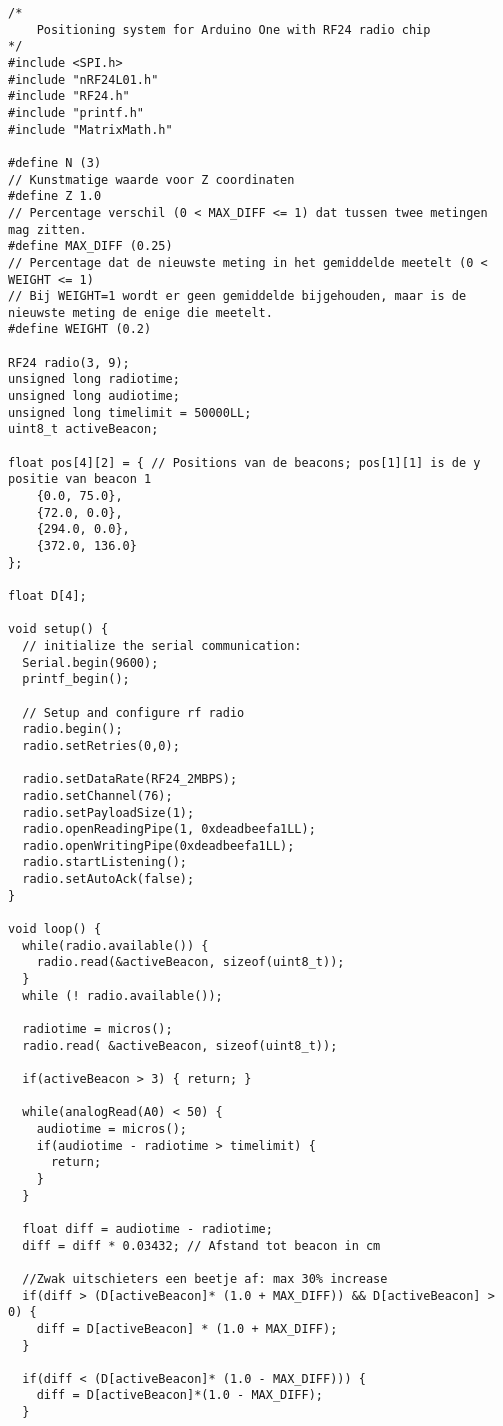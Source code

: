 \begin{lstlisting}
/*
    Positioning system for Arduino One with RF24 radio chip
*/
#include <SPI.h>
#include "nRF24L01.h"
#include "RF24.h"
#include "printf.h"
#include "MatrixMath.h"

#define N (3)
// Kunstmatige waarde voor Z coordinaten
#define Z 1.0
// Percentage verschil (0 < MAX_DIFF <= 1) dat tussen twee metingen mag zitten.
#define MAX_DIFF (0.25)
// Percentage dat de nieuwste meting in het gemiddelde meetelt (0 < WEIGHT <= 1)
// Bij WEIGHT=1 wordt er geen gemiddelde bijgehouden, maar is de nieuwste meting de enige die meetelt.
#define WEIGHT (0.2)

RF24 radio(3, 9);
unsigned long radiotime;
unsigned long audiotime;
unsigned long timelimit = 50000LL;
uint8_t activeBeacon;

float pos[4][2] = { // Positions van de beacons; pos[1][1] is de y positie van beacon 1
    {0.0, 75.0},
    {72.0, 0.0},
    {294.0, 0.0},
    {372.0, 136.0}
};

float D[4];

void setup() {
  // initialize the serial communication:
  Serial.begin(9600);
  printf_begin();

  // Setup and configure rf radio
  radio.begin();
  radio.setRetries(0,0);

  radio.setDataRate(RF24_2MBPS);
  radio.setChannel(76);
  radio.setPayloadSize(1);
  radio.openReadingPipe(1, 0xdeadbeefa1LL);
  radio.openWritingPipe(0xdeadbeefa1LL);
  radio.startListening();
  radio.setAutoAck(false);
}

void loop() {
  while(radio.available()) { 
    radio.read(&activeBeacon, sizeof(uint8_t)); 
  }
  while (! radio.available());

  radiotime = micros();
  radio.read( &activeBeacon, sizeof(uint8_t));

  if(activeBeacon > 3) { return; }

  while(analogRead(A0) < 50) {
    audiotime = micros();
    if(audiotime - radiotime > timelimit) {
      return; 
    }
  }
  
  float diff = audiotime - radiotime;
  diff = diff * 0.03432; // Afstand tot beacon in cm

  //Zwak uitschieters een beetje af: max 30% increase
  if(diff > (D[activeBeacon]* (1.0 + MAX_DIFF)) && D[activeBeacon] > 0) {
    diff = D[activeBeacon] * (1.0 + MAX_DIFF);
  }
  
  if(diff < (D[activeBeacon]* (1.0 - MAX_DIFF))) {
    diff = D[activeBeacon]*(1.0 - MAX_DIFF);
  }
  

\end{lstlisting}

